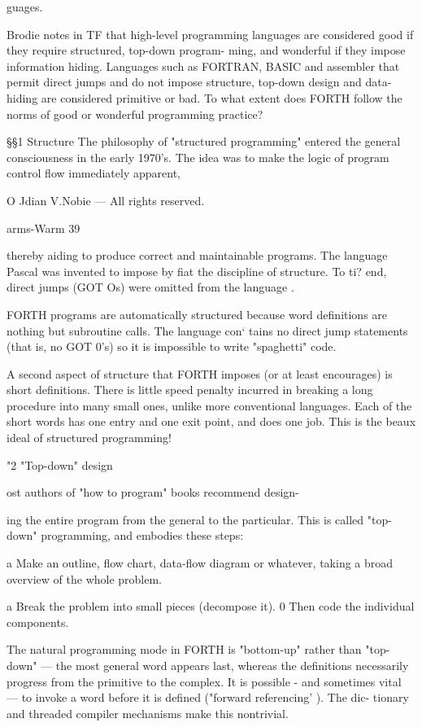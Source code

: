 guages.

Brodie notes in TF that high-level programming languages are
considered good if they require structured, top-down program-
ming, and wonderful if they impose information hiding. Languages
such as FORTRAN, BASIC and assembler that permit direct
jumps and do not impose structure, top-down design and data-
hiding are considered primitive or bad. To what extent does
FORTH follow the norms of good or wonderful programming
practice?

§§1 Structure
The philosophy of "structured programming" entered the
general consciousness in the early 1970’s. The idea was to
make the logic of program control flow immediately apparent,

O Jdian V.Nobie — All rights reserved.

arms-Warm 39

thereby aiding to produce correct and maintainable programs.
The language Pascal was invented to impose by fiat the discipline
of structure. To ti? end, direct jumps (GOT Os) were omitted
from the language .

FORTH programs are automatically structured because word
definitions are nothing but subroutine calls. The language con‘
tains no direct jump statements (that is, no GOT 0's) so it is
impossible to write "spaghetti" code.

A second aspect of structure that FORTH imposes (or at least
encourages) is short definitions. There is little speed penalty
incurred in breaking a long procedure into many small ones,
unlike more conventional languages. Each of the short words has
one entry and one exit point, and does one job. This is the beaux
ideal of structured programming!

"2 "Top-down" design

ost authors of "how to program" books recommend design-

ing the entire program from the general to the particular.
This is called "top-down" programming, and embodies these
steps:

a Make an outline, ﬂow chart, data-ﬂow diagram or whatever,
taking a broad overview of the whole problem.

a Break the problem into small pieces (decompose it).
0 Then code the individual components.

The natural programming mode in FORTH is "bottom-up"
rather than "top-down" — the most general word appears last,
whereas the definitions necessarily progress from the primitive
to the complex. It is possible - and sometimes vital — to invoke
a word before it is defined ("forward referencing’ ). The dic-
tionary and threaded compiler mechanisms make this nontrivial.

